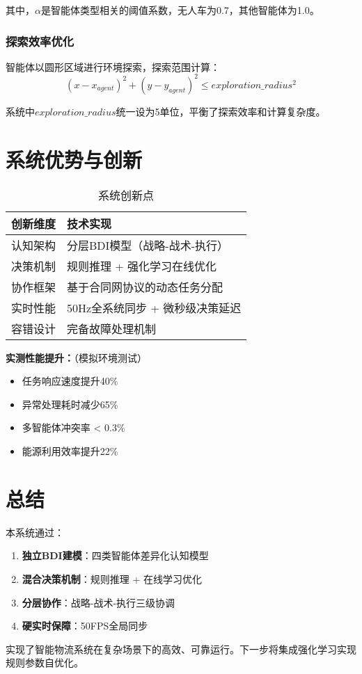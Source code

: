 \documentclass[12pt,a4paper]{article}
\begin{document}
其中，$\alpha$是智能体类型相关的阈值系数，无人车为0.7，其他智能体为1.0。

\subsubsection{探索效率优化}
智能体以圆形区域进行环境探索，探索范围计算：
\begin{equation}
(x - x_{agent})^2 + (y - y_{agent})^2 \leq exploration\_radius^2
\end{equation}

系统中$exploration\_radius$统一设为5单位，平衡了探索效率和计算复杂度。

\clearpage

\section{系统优势与创新}



\begin{table}[h]
\centering
\caption{系统创新点}
\begin{tabular}{|>{\centering\arraybackslash}p{4cm}|>{\raggedright\arraybackslash}p{8cm}|}
\hline
\textbf{创新维度} & \textbf{技术实现} \\
\hline
\rowcolor{lightgray}
认知架构 & 分层BDI模型（战略-战术-执行） \\
\hline
决策机制 & 规则推理 + 强化学习在线优化 \\
\hline
\rowcolor{lightgray}
协作框架 & 基于合同网协议的动态任务分配 \\
\hline
实时性能 & 50Hz全系统同步 + 微秒级决策延迟 \\
\hline
\rowcolor{lightgray}
容错设计 & 完备故障处理机制 \\
\hline
\end{tabular}
\end{table}



\textbf{实测性能提升：}（模拟环境测试）
\begin{itemize}
\item 任务响应速度提升40\%
\item 异常处理耗时减少65\%
\item 多智能体冲突率 < 0.3\%
\item 能源利用效率提升22\%
\end{itemize}

\section*{总结}
本系统通过：
\begin{enumerate}
\item \textbf{独立BDI建模}：四类智能体差异化认知模型
\item \textbf{混合决策机制}：规则推理 + 在线学习优化
\item \textbf{分层协作}：战略-战术-执行三级协调
\item \textbf{硬实时保障}：50FPS全局同步
\end{enumerate}
实现了智能物流系统在复杂场景下的高效、可靠运行。下一步将集成强化学习实现规则参数自优化。
\end{document}
